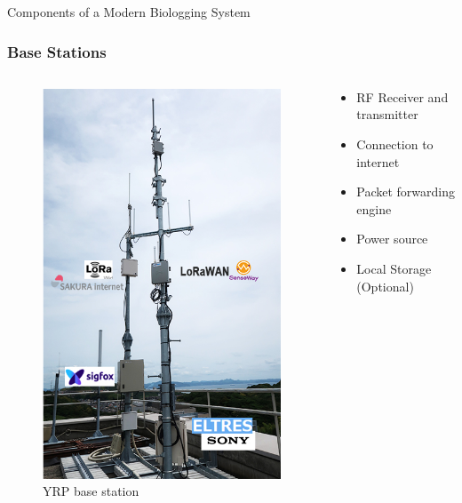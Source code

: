 \documentclass{beamer}
\begin{document}
  \begin{frame}{Components of a Modern Biologging System}
    \frametitle{Base Stations}
    \begin{columns}
      \begin{column}{0.4\textwidth}
        \begin{figure}[htbp]
          \centering
          \includegraphics[height=.6\textheight]{BaseStation.jpg}
          \caption{YRP base station \cite{miyajima_2020}}
          \label{fig:LPWAN_Base_Station}
        \end{figure}
      \end{column}
      \begin{column}{0.6\textwidth}
        \begin{itemize}
          \item RF Receiver and transmitter
          \item Connection to internet
          \item Packet forwarding engine
          \item Power source
          \item Local Storage (Optional)
        \end{itemize}
      \end{column}
    \end{columns}
  \end{frame}
\end{document}
